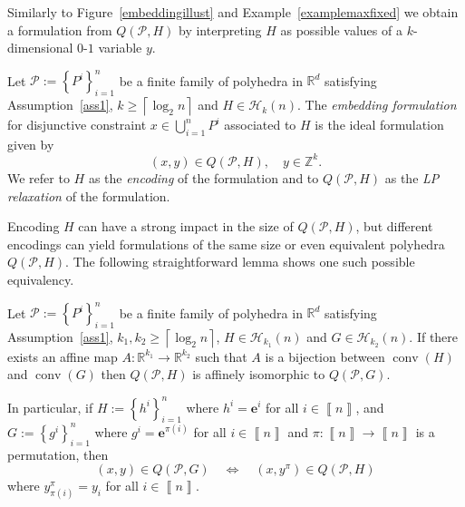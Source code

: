 \documentclass[mnsc]{informs3}
\newcommand{\set}[1]{\left\{#1\right\}}                     %
\newcommand{\bra}[1]{\left(#1\right)}
\newcommand{\sidx}[1]{\left\llbracket     #1 \right\rrbracket}
\newcommand{\Real}{\mathbb R}
\newcommand{\e}{\mathbf{e}}
\DeclareMathOperator{\conv}{conv}
\begin{document}
Similarly to Figure~\ref{embeddingillust} and Example~\ref{examplemaxfixed} we obtain a formulation from $Q\bra{\mathcal{P},H}$ by interpreting $H$ as possible values of a $k$-dimensional  $0$-$1$ variable $y$.
\begin{definition}\label{embeddingformdef}
 Let $\mathcal{P}:=\set{P^i}_{i=1}^n$ be a finite family of polyhedra in $\Real^d$ satisfying Assumption~\ref{ass1}, $k\geq \left\lceil \log_2 n\right\rceil$ and $H\in \mathcal{H}_k(n)$. The \emph{embedding formulation} for disjunctive constraint $x\in \bigcup_{i=1}^n P^i$ associated to $H$ is the ideal formulation given by 
 \[ \bra{x,y}\in Q\bra{\mathcal{P},H},\quad y\in \mathbb{Z}^k.\]
We refer to $H$ as the \emph{encoding} of the formulation and to $Q\bra{\mathcal{P},H}$ as the \emph{LP relaxation} of the formulation.
\end{definition}

Encoding $H$ can have a strong impact in the size of $Q\bra{\mathcal{P},H}$, but different encodings can yield formulations of the same size or even equivalent polyhedra $Q\bra{\mathcal{P},H}$. The following straightforward lemma shows one such possible equivalency. 
\begin{lemma}\label{isolemma}
Let $\mathcal{P}:=\set{P^i}_{i=1}^n$ be a finite family of polyhedra in $\Real^d$ satisfying Assumption~\ref{ass1}, $k_1,k_2\geq \left\lceil \log_2 n\right\rceil$, $H\in \mathcal{H}_{k_1}(n)$ and $G\in \mathcal{H}_{k_2}(n)$. If there exists an affine map  $A:\Real^{k_1}\to \Real^{k_2}$ such that $A$ is a bijection between $\conv\bra{H}$ and $\conv\bra{G}$ then $Q\bra{\mathcal{P},H}$ is affinely isomorphic  to $Q\bra{\mathcal{P},G}$.

In particular, if $H:=\set{h^i}_{i=1}^n$  where $h^i=\e^i$ for all $i\in \sidx{n}$, and  $G:=\set{g^i}_{i=1}^n$  where $g^i=\e^{\pi(i)}$ for all $i\in \sidx{n}$ and $\pi:\sidx{n}\to \sidx{n}$ is a permutation, then 
\[\bra{x,y}\in Q\bra{\mathcal{P},G} \quad \Leftrightarrow \quad \bra{x,y^\pi}\in Q\bra{\mathcal{P},H}  \]
where $y^\pi_{\pi\bra{i}}=y_i$ for all $i\in \sidx{n}$.
\end{lemma}
\end{document}
